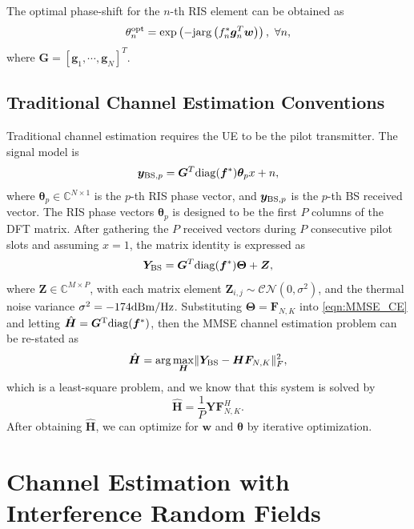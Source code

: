 \documentclass[12pt,draftclsnofoot,journal,onecolumn]{IEEEtran}
\theoremstyle{nonumberplain}
\def \opt {^{\text{opt}}}
\def \opt {^{\text{opt}}}
\def \exp {\text{exp}}
\def \arg {\text{arg}}
\def \CN {\mathcal{CN}}
\begin{document}
The optimal phase-shift for the $n$-th RIS element can be obtained as
\begin{equation}
\label{optimal RIS}
\theta_{n}\opt = \exp\left(-{\rm j} \arg\left(f_{n}^{*}\bm g_{n}^{T}\bm w\right)\right),~\forall n,
\end{equation}
where $\bm G = \left[\bm g_{1}, \cdots, \bm g_{N}\right]^{T}$.

\subsection{Traditional Channel Estimation Conventions}
    Traditional channel estimation requires the UE to be the pilot transmitter. The signal model is 
    \begin{equation}
        {\bm y}_{{\rm BS}, p} = {\bm G}^{T} {\rm diag}({\bm f}^{*}) {\bm \theta}_p x+n, 
    \end{equation}
    where ${\bm \theta}_p \in \mathbb{C}^{N\times 1}$ is the $p$-th RIS phase vector, and ${\bm y}_{{\rm BS}, p}$ is the $p$-th  BS received vector. The RIS phase vectors ${\bm \theta}_p$ is designed to be the first $P$ columns of the DFT matrix. After gathering the $P$ received vectors during $P$ consecutive pilot slots and assuming $x=1$, the matrix identity is expressed as 
    \begin{equation}
        {\bm Y}_{\rm BS}={\bm G}^{T} {\rm diag}({\bm f}^{*}) {\bm \Theta} + {\bm Z}, 
        \label{eqn:MMSE_CE}
    \end{equation} 
    where ${\bm Z}\in \mathbb{C}^{M\times P}$, with each matrix element ${\bm Z}_{i,j}\sim \CN(0,\sigma^2)$, and the thermal noise variance $\sigma^2=-174{\rm dBm/Hz}$. Substituting ${\bm \Theta} = {\bm F}_{N,K}$ into \eqref{eqn:MMSE_CE} and letting $\hat{\bm H} = {\bm G}^{\rm T}{\rm diag}({\bm f}^{*})$, then the MMSE channel estimation problem can be re-stated as 
    \begin{equation}
        \hat{\bm H} = \arg\max_{\bm H} \lVert {\bm Y}_{\rm BS} - {\bm H} {\bm F}_{N,K}\rVert_{F}^2,
    \end{equation}
    which is a least-square problem, and we know that this system is solved by 
    \begin{equation}
        \hat{\bm H} = \frac{1}{P}{\bm Y}{\bm F}_{N,K}^{H}.
    \end{equation}
    After obtaining $\hat{\bm H}$, we can optimize for ${\bm w}$ and ${\bm \theta}$ by iterative optimization.

\section{Channel Estimation with Interference Random Fields}
\end{document}
